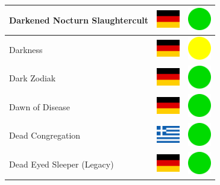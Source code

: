 \documentclass[12pt, a4paper, twoside]{report}
\begin{document}
\begin{center}
\begin{longtable}{|p{5cm}|p{2cm}|p{2cm}|}
Darkened Nocturn Slaughtercult & \includegraphics[width=1cm]{4x3/de} & \includegraphics[width=1cm]{likes/y} \\ \hline
Darkness & \includegraphics[width=1cm]{4x3/de} & \includegraphics[width=1cm]{likes/m} \\ \hline
Dark Zodiak & \includegraphics[width=1cm]{4x3/de} & \includegraphics[width=1cm]{likes/y} \\ \hline
Dawn of Disease & \includegraphics[width=1cm]{4x3/de} & \includegraphics[width=1cm]{likes/y} \\ \hline
Dead Congregation & \includegraphics[width=1cm]{4x3/gr} & \includegraphics[width=1cm]{likes/y} \\ \hline
Dead Eyed Sleeper (Legacy) & \includegraphics[width=1cm]{4x3/de} & \includegraphics[width=1cm]{likes/y} \\ \hline

\end{longtable}
\end{center}
\end{document}
